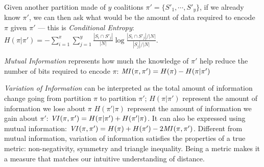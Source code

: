 Given another partition made of $y$ coalitions $\pi' = \{S'_1, \cdots, S'_y\}$,
if we already know $\pi'$, we can then ask what would be the amount of data
required to encode $\pi$ given $\pi'$ --- this is \textit{Conditional Entropy}:
$H(\pi|\pi') = - \sum^x_{i=1} \sum^y_{j=1} \frac{|S_i \cap S'_j|}{|N|} \log{\frac{|S_i \cap S'_j|/|N|}{|S_j|/|N|}}$.

\textit{Mutual Information} represents how much the knowledge of $\pi'$ help
reduce the number of bits required to encode $\pi$:
$\mathit{MI}(\pi, \pi') = H(\pi) - H(\pi|\pi')$

\textit{Variation of Information} can be interpreted as the total amount of
information change going from partition $\pi$ to partition $\pi'$;
$H(\pi|\pi')$ represent the amount of information we lose about $\pi$
$H(\pi'|\pi)$ represent the amount of information we gain about $\pi'$:
$\mathit{VI}(\pi, \pi') = H(\pi|\pi') + H(\pi'|\pi)$.
It can also be expressed using mutual information:
$\mathit{VI}(\pi, \pi') = H(\pi) + H(\pi') - 2\mathit{MI}(\pi, \pi')$.
Different from mutual information, variation of information satisfies the
properties of a true metric: non-negativity, symmetry and triangle inequality.
Being a metric makes it a measure that matches our intuitive understanding of
distance.

